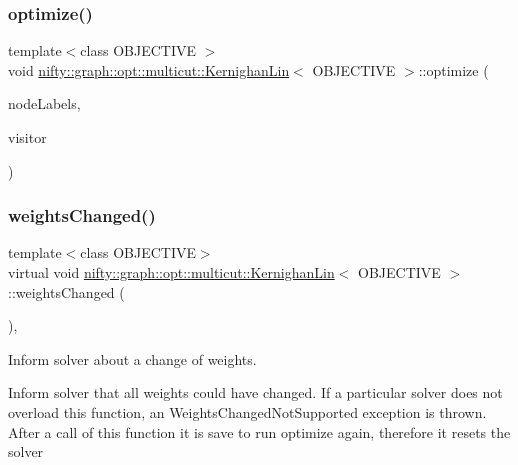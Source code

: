 \subsubsection{\texorpdfstring{optimize()}{optimize()}}
{\footnotesize\ttfamily template$<$class O\+B\+J\+E\+C\+T\+I\+VE $>$ \\
void \hyperlink{classnifty_1_1graph_1_1opt_1_1multicut_1_1KernighanLin}{nifty\+::graph\+::opt\+::multicut\+::\+Kernighan\+Lin}$<$ O\+B\+J\+E\+C\+T\+I\+VE $>$\+::optimize (\begin{DoxyParamCaption}\item[{\hyperlink{classnifty_1_1graph_1_1opt_1_1multicut_1_1KernighanLin_acc82419d254c543b753b17fd26ef0818}{Node\+Labels\+Type} \&}]{node\+Labels,  }\item[{\hyperlink{classnifty_1_1graph_1_1opt_1_1multicut_1_1KernighanLin_a04b6ab578786c0fae38522f49a6a9686}{Visitor\+Base\+Type} $\ast$}]{visitor }\end{DoxyParamCaption})\hspace{0.3cm}{\ttfamily [virtual]}}

\mbox{\label{classnifty_1_1graph_1_1opt_1_1multicut_1_1KernighanLin_ab1238ad81c57f105502a940986e9ffaf}} 
\subsubsection{\texorpdfstring{weights\+Changed()}{weightsChanged()}}
{\footnotesize\ttfamily template$<$class O\+B\+J\+E\+C\+T\+I\+VE$>$ \\
virtual void \hyperlink{classnifty_1_1graph_1_1opt_1_1multicut_1_1KernighanLin}{nifty\+::graph\+::opt\+::multicut\+::\+Kernighan\+Lin}$<$ O\+B\+J\+E\+C\+T\+I\+VE $>$\+::weights\+Changed (\begin{DoxyParamCaption}{ }\end{DoxyParamCaption})\hspace{0.3cm}{\ttfamily [inline]}, {\ttfamily [virtual]}}



Inform solver about a change of weights. 

Inform solver that all weights could have changed. If a particular solver does not overload this function, an Weights\+Changed\+Not\+Supported exception is thrown. After a call of this function it is save to run optimize again, therefore it resets the solver 

